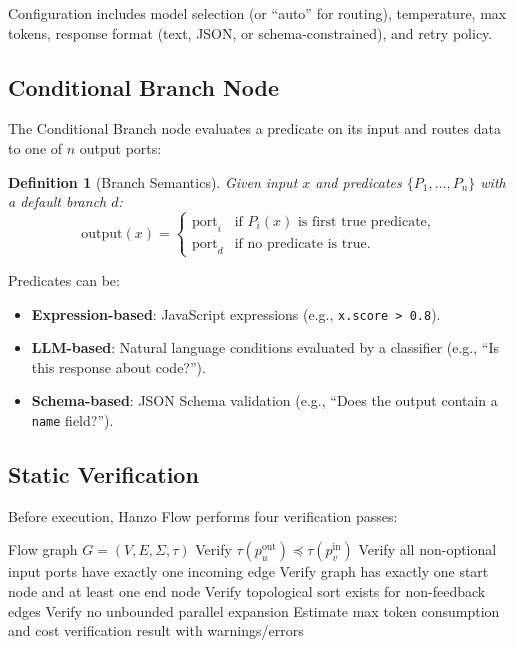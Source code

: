 \documentclass[11pt,twocolumn]{article}
\newtheorem{definition}{Definition}
\begin{document}
Configuration includes model selection (or ``auto'' for routing), temperature, max tokens, response format (text, JSON, or schema-constrained), and retry policy.

\subsection{Conditional Branch Node}

The Conditional Branch node evaluates a predicate on its input and routes data to one of $n$ output ports:

\begin{definition}[Branch Semantics]
Given input $x$ and predicates $\{P_1, \ldots, P_n\}$ with a default branch $d$:
\begin{equation}
\text{output}(x) = \begin{cases}
\text{port}_i & \text{if } P_i(x) \text{ is first true predicate}, \\
\text{port}_d & \text{if no predicate is true}.
\end{cases}
\end{equation}
\end{definition}

Predicates can be:
\begin{itemize}[leftmargin=1.1em]
    \item \textbf{Expression-based}: JavaScript expressions (e.g., \texttt{x.score > 0.8}).
    \item \textbf{LLM-based}: Natural language conditions evaluated by a classifier (e.g., ``Is this response about code?'').
    \item \textbf{Schema-based}: JSON Schema validation (e.g., ``Does the output contain a \texttt{name} field?'').
\end{itemize}

\subsection{Static Verification}

Before execution, Hanzo Flow performs four verification passes:

\begin{algorithm}[H]
\caption{Static Flow Verification}
\label{alg:verify}
\begin{algorithmic}[1]
\Require Flow graph $G = (V, E, \Sigma, \tau)$
\State {}
    \State Verify $\tau(p_u^{\text{out}}) \preceq \tau(p_v^{\text{in}})$
\EndFor
\State {}
\State Verify all non-optional input ports have exactly one incoming edge
\State Verify graph has exactly one start node and at least one end node
\State {}
\State Verify topological sort exists for non-feedback edges
\State {}
\State Verify no unbounded parallel expansion
\State Estimate max token consumption and cost
\State \Return verification result with warnings/errors
\end{algorithmic}
\end{algorithm}
\end{document}
